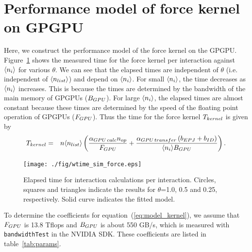 \documentclass[dvipdfmx]{pasj01}
\begin{document}





\section{Performance model of force kernel on GPGPU}
\label{sec:model_gpu}

Here, we construct the performance model of the force kernel on the
GPGPU.  Figure~\ref{fig:wtime_test_force} shows the measured time for
the force kernel per interaction against $\langle n_{\rm i} \rangle$
for various $\theta$. We can see that the elapsed times are
independent of $\theta$ (i.e. independent of $\langle n_{\rm list}
\rangle$) and depend on $\langle n_{\rm i} \rangle$. For small
$\langle n_{\rm i} \rangle$, the time decreases as $\langle n_{\rm i}
\rangle$ increases. This is because the times are determined by the
bandwidth of the main memory of GPGPUs ($B_{\rm GPU}$). For large
$\langle n_{\rm i} \rangle$, the elapsed times are almost constant
because these times are determined by the speed of the floating point
operation of GPGPUs ($F_{\rm GPU}$). Thus the time for the force
kernel $T_{\rm kernel}$ is given by
\begin{eqnarray}
  T_{\rm kernel} &=& n \langle n_{\rm list} \rangle \left( \frac{\alpha_{\rm GPU\, calc} n_{\rm op}}{F_{\rm GPU}}
  + \frac{\alpha_{\rm GPU\, transfer} \left(b_{\rm EPJ}+b_{\rm ID} \right)}{ \langle n_i \rangle {B_{\rm GPU}}}  \right).
  \label{eq:model_kernel}
\end{eqnarray}

\begin{figure}
    \begin{center}
      \texttt{[image: ./fig/wtime\_sim\_force.eps]}
    \end{center}
    \caption{Elapsed time for interaction calculations per
      interaction.  Circles, squares and triangles indicate the
      results for $\theta$=1.0, 0.5 and 0.25, respectively. Solid
      curve indicates the fitted model.}
  \label{fig:wtime_test_force}
\end{figure}

To determine the coefficients for equation~(\ref{eq:model_kernel}), we
assume that $F_{\rm GPU}$ is 13.8 Tflops and ${B_{\rm GPU}}$ is about
550 GB/s, which is measured with {\tt bandwidthTest} in the NVIDIA
SDK. These coefficients are listed in table~\ref{tab:params}.
\end{document}
